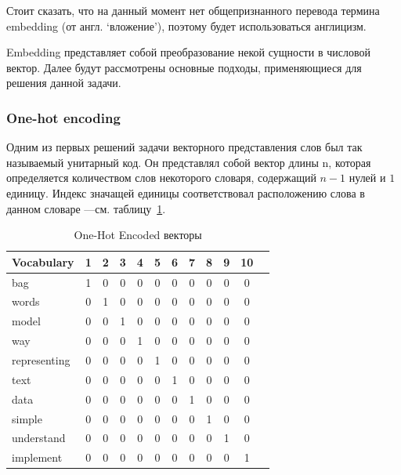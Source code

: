 Стоит сказать, что на данный момент нет общепризнанного перевода термина embedding (от англ. ‘вложение’), поэтому будет использоваться англицизм. 

Embedding представляет собой преобразование некой сущности в числовой вектор. Далее будут рассмотрены основные подходы, применяющиеся для решения данной задачи.

\subsubsection{One-hot encoding}

Одним из первых решений задачи векторного представления слов был так называемый унитарный код. Он представлял собой вектор длины n, которая определяется количеством слов некоторого словаря, содержащий $n-1$ нулей и $1$ единицу. Индекс значащей единицы соответствовал расположению слова в данном словаре ---см. таблицу~\ref{tab:bow-ohe}.

\begin{table}
\centering
\caption{\label{tab:bow-ohe}One-Hot Encoded векторы}
\begin{tabular}{@{}lccccccccccc@{}}
\toprule
Vocabulary   & 1 & 2 & 3 & 4 & 5 & 6 & 7 & 8 & 9 & 10 \\ \midrule
bag          & 1 & 0 & 0 & 0 & 0 & 0 & 0 & 0 & 0 & 0  \\
words        & 0 & 1 & 0 & 0 & 0 & 0 & 0 & 0 & 0 & 0  \\
model        & 0 & 0 & 1 & 0 & 0 & 0 & 0 & 0 & 0 & 0  \\
way          & 0 & 0 & 0 & 1 & 0 & 0 & 0 & 0 & 0 & 0  \\
representing & 0 & 0 & 0 & 0 & 1 & 0 & 0 & 0 & 0 & 0  \\
text         & 0 & 0 & 0 & 0 & 0 & 1 & 0 & 0 & 0 & 0  \\
data         & 0 & 0 & 0 & 0 & 0 & 0 & 1 & 0 & 0 & 0  \\
simple       & 0 & 0 & 0 & 0 & 0 & 0 & 0 & 1 & 0 & 0  \\
understand   & 0 & 0 & 0 & 0 & 0 & 0 & 0 & 0 & 1 & 0  \\
implement    & 0 & 0 & 0 & 0 & 0 & 0 & 0 & 0 & 0 & 1  \\ \bottomrule
\end{tabular}
\end{table}

